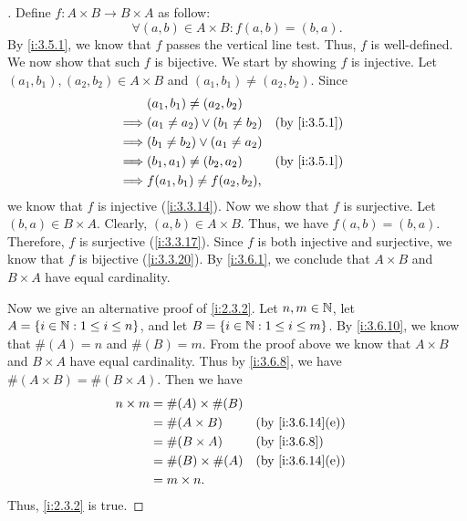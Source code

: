 \begin{proof}[]
  Define \(f : A \times B \to B \times A\) as follow:
  \[
    \forall (a, b) \in A \times B : f(a, b) = (b, a).
  \]
  By \cref{i:3.5.1}, we know that \(f\) passes the vertical line test.
  Thus, \(f\) is well-defined.
  We now show that such \(f\) is bijective.
  We start by showing \(f\) is injective.
  Let \((a_1, b_1), (a_2, b_2) \in A \times B\) and \((a_1, b_1) \neq (a_2, b_2)\).
  Since
  \begin{align*}
             & (a_1, b_1) \neq (a_2, b_2)                           \\
    \implies & (a_1 \neq a_2) \lor (b_1 \neq b_2) &  & \by{i:3.5.1} \\
    \implies & (b_1 \neq b_2) \lor (a_1 \neq a_2)                   \\
    \implies & (b_1, a_1) \neq (b_2, a_2)         &  & \by{i:3.5.1} \\
    \implies & f(a_1, b_1) \neq f(a_2, b_2),
  \end{align*}
  we know that \(f\) is injective (\cref{i:3.3.14}).
  Now we show that \(f\) is surjective.
  Let \((b, a) \in B \times A\).
  Clearly, \((a, b) \in A \times B\).
  Thus, we have \(f(a, b) = (b, a)\).
  Therefore, \(f\) is surjective (\cref{i:3.3.17}).
  Since \(f\) is both injective and surjective, we know that \(f\) is bijective (\cref{i:3.3.20}).
  By \cref{i:3.6.1}, we conclude that \(A \times B\) and \(B \times A\) have equal cardinality.

  Now we give an alternative proof of \cref{i:2.3.2}.
  Let \(n, m \in \mathbb{N}\), let \(A = \left\lbrace i \in \mathbb{N} : 1 \leq i \leq n\right\rbrace\), and let \(B = \left\lbrace i \in \mathbb{N} : 1 \leq i \leq m\right\rbrace\).
  By \cref{i:3.6.10}, we know that \(\#(A) = n\) and \(\#(B) = m\).
  From the proof above we know that \(A \times B\) and \(B \times A\) have equal cardinality.
  Thus by \cref{i:3.6.8}, we have \(\#(A \times B) = \#(B \times A)\).
  Then we have
  \begin{align*}
    n \times m & = \#(A) \times \#(B)                       \\
               & = \#(A \times B)     &  & \by{i:3.6.14}[e] \\
               & = \#(B \times A)     &  & \by{i:3.6.8}     \\
               & = \#(B) \times \#(A) &  & \by{i:3.6.14}[e] \\
               & = m \times n.
  \end{align*}
  Thus, \cref{i:2.3.2} is true.
\end{proof}


